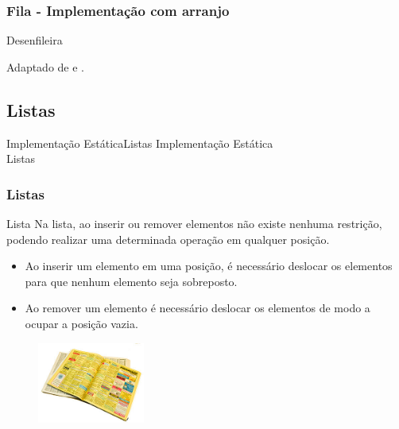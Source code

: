 \documentclass[aspectratio=169]{beamer}
\begin{document}

\begin{frame}
\frametitle{Fila - Implementação com arranjo}
\begin{algorithm}[H]
\caption{Desenfileira} 
\label{Desenfileira}
\end{algorithm}
\tiny{ Adaptado de  e .}
\end{frame}

\subsection{Listas}


\begin{frame}{Implementação Estática}{Listas}
\centering
\huge{Implementação Estática\\
Listas
}
\end{frame}


\begin{frame}
\frametitle{Listas}
\begin{block}{Lista}
Na lista, ao inserir ou remover elementos não existe nenhuma restrição, podendo realizar uma determinada operação em qualquer posição.
\end{block}
\begin{itemize}
 \item Ao inserir um elemento em uma posição, é necessário deslocar os elementos para que nenhum elemento seja sobreposto.
 \item Ao remover um elemento é necessário deslocar os elementos de modo a ocupar a posição vazia.
\end{itemize}
\begin{figure}[!h]
  \centering
  \includegraphics[width=100pt]{imgs/lista.jpg}
  \label{fig_lista}
\end{figure}
\end{frame}
\end{document}
